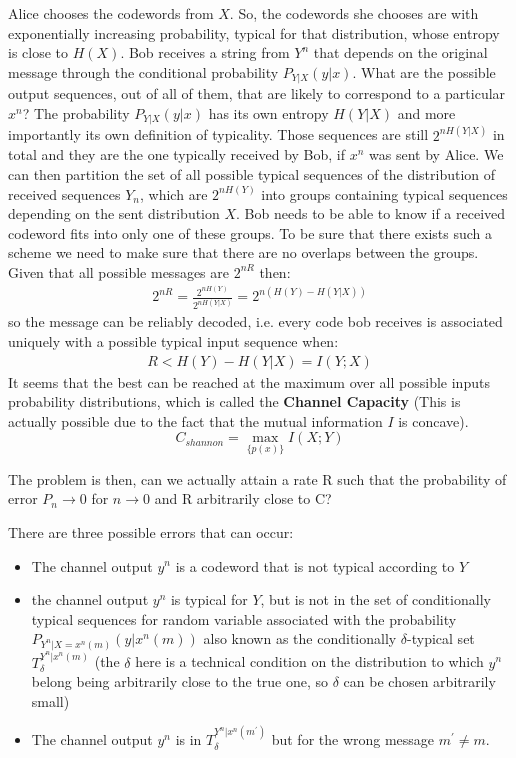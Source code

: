 Alice chooses the codewords from $X$. So, the codewords she chooses are with exponentially increasing probability, typical for that distribution, whose entropy is close to $H(X)$. Bob receives a string from $Y^n$ that depends on the original message through the conditional probability $P_{Y|X}(y|x)$. What are the possible output sequences, out of all of them, that are likely to correspond to a particular $x^n$? The probability $P_{Y|X}(y|x)$ has its own entropy $H(Y|X)$ and more importantly its own definition of typicality. Those sequences are still $2^{nH(Y|X)}$ in total and they are the one typically received by Bob, if $x^n$ was sent by Alice. We can then partition the set of all possible typical sequences of the distribution of received sequences $Y_n$, which are $2^{nH(Y)}$ into groups containing typical sequences depending on the sent distribution $X$. Bob needs to be able to know if a received codeword fits into only one of these groups. To be sure that there exists such a scheme we need to make sure that there are no overlaps between the groups. Given that all possible messages are $2^{nR}$ then:
\begin{eqnarray}
2^{nR} = \frac{2^{nH(Y)}}{2^{nH(Y|X)}} = 2^{n(H(Y) - H(Y|X))}
\end{eqnarray}
so the message can be reliably decoded, i.e. every code bob receives is associated uniquely with a possible typical input sequence when:
\begin{eqnarray}
R < H(Y) - H(Y|X) = I(Y;X)
\end{eqnarray}
It seems that the best can be reached at the maximum over all possible inputs probability distributions, which is called the \textbf{Channel Capacity} (This is actually possible due to the fact that the mutual information $I$ is concave).
\begin{equation}
C_{shannon} = \max_{\{p(x)\}} I(X;Y)
\end{equation}

The problem is then, can we actually attain a rate R such that the probability of error $P_n \rightarrow 0$ for $n \rightarrow 0$ and R arbitrarily close to C?

There are three possible errors that can occur:
\begin{itemize}
	\item The channel output $y^n$ is a codeword that is not typical according to $Y$
	\item the channel output $y^n$ is typical for $Y$, but is not in the set of conditionally typical sequences for random variable associated with the probability $P_{Y^n|X=x^n(m)}(y|x^n(m))$ also known as the conditionally 
	$\delta$-typical set $T^{Y^n|x^n(m)}_\delta$ (the $\delta$ here is a technical condition on the distribution to which $y^n$ belong being arbitrarily close to the true one, so $\delta$ can be chosen arbitrarily small)
	\item The channel output $y^n$ is in $T^{Y^n|x^n(m^\prime)}_\delta$ but for the wrong message $m^\prime \neq m$.
\end{itemize}

